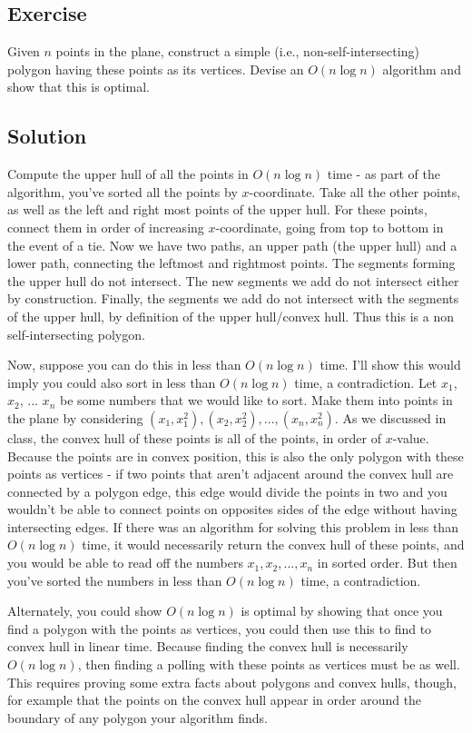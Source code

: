 \documentclass{article}
\newcounter{counter}
\newcommand{\Exercise}{Exercise \stepcounter{counter}\thecounter}
\begin{document}
\subsection*{\Exercise}
    Given $n$ points in the plane, construct a simple (i.e., non-self-intersecting) polygon having these points as its vertices. Devise an $O(n \log n)$  algorithm and show that this is optimal.
    
\subsection*{Solution}
    Compute the upper hull of all the points in $O(n\log n)$ time - as part of the algorithm, you've sorted all the points by $x$-coordinate. Take all the other points, as well as the left and right most points of the upper hull. For these points, connect them in order of increasing $x$-coordinate, going from top to bottom in the event of a tie. Now we have two paths, an upper path (the upper hull) and a lower path, connecting the leftmost and rightmost points. The segments forming the upper hull do not intersect. The new segments we add do not intersect either by construction. Finally, the segments we add do not intersect with the segments of the upper hull, by definition of the upper hull/convex hull. Thus this is a non self-intersecting polygon.

  \vspace{3mm}
  Now, suppose you can do this in less than $O(n\log n)$ time. I'll show this would imply you could also sort in less than $O(n\log n)$ time, a contradiction. Let $x_1$, $x_2$, ... $x_n$ be some numbers that we would like to sort. Make them into points in the plane by considering $(x_1, x_1^2), (x_2, x_2^2),...,(x_n, x_n^2)$.  As we discussed in class, the convex hull of these points is all of the points, in order  of $x$-value. Because the points are in convex position, this is also the only polygon with these points as vertices - if two points that aren't adjacent around the convex hull are connected by a polygon edge, this edge would divide the points in two and you wouldn't be able to connect points on opposites sides of the edge without having intersecting edges.  If there was an algorithm for solving this problem in less than $O(n\log n)$ time, it would necessarily return the convex hull of these points, and you would be able to read off the numbers $x_1, x_2,...,x_n$ in sorted order. But then you've sorted the numbers in less than $O(n\log n)$ time, a contradiction. 

  \vspace{3mm}
  Alternately, you could show $O(n\log n)$ is optimal by showing that once you find a polygon with the points as vertices, you could then use this to find to convex hull in linear time. Because finding the convex hull is necessarily $O(n\log n)$, then finding a polling with these points as vertices must be as well. This requires proving some extra facts about polygons and convex hulls, though, for example that the points on the convex hull appear in order around the boundary of any polygon your algorithm finds. 
  
\end{document}
